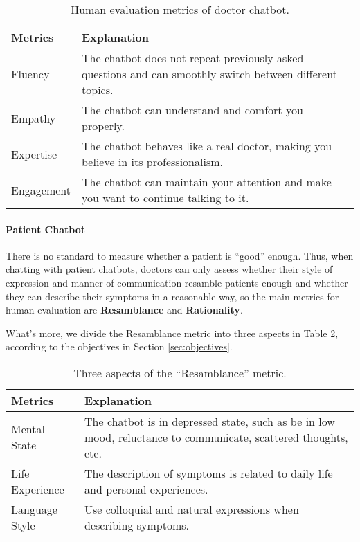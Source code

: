 \begin{table}[h]
    \centering
    \footnotesize
    \begin{tabular}{m{}|m{}}
    \hline
    Metrics & Explanation \\
    \hline
    Fluency & The chatbot does not repeat previously asked questions and can smoothly switch between different topics. \\
    \hline
    Empathy & The chatbot can understand and comfort you properly. \\
    \hline
    Expertise & The chatbot behaves like a real doctor, making you believe in its professionalism. \\
    \hline
    Engagement & The chatbot can maintain your attention and make you want to continue talking to it. \\
    \hline
    \end{tabular}
    \caption{Human evaluation metrics of doctor chatbot.}
    \label{tab:human_eval_doctor}
\end{table}

\paragraph{Patient Chatbot} 
There is no standard to measure whether a patient is ``good'' enough. Thus, when chatting with patient chatbots, doctors can only assess whether their style of expression and manner of communication resamble patients enough and whether they can describe their symptoms in a reasonable way, so the main metrics for human evaluation are \textbf{Resamblance} and \textbf{Rationality}.

What's more, we divide the Resamblance metric into three aspects in Table \ref{tab:human_eval_patient}, according to the objectives in Section \ref{sec:objectives}.

\begin{table}[h]
    \centering
    \footnotesize
    \begin{tabular}{m{}|m{}}
    \hline
    Metrics & Explanation \\
    \hline
    Mental State & The chatbot is in depressed state, such as be in low mood, reluctance to communicate, scattered thoughts, etc.\\
    \hline
    Life Experience & The description of symptoms is related to daily life and personal experiences.\\
    \hline
    Language Style & Use colloquial and natural expressions when describing symptoms.\\
    \hline
    \end{tabular}
    \caption{Three aspects of the ``Resamblance'' metric.}
    \label{tab:human_eval_patient}
\end{table}

